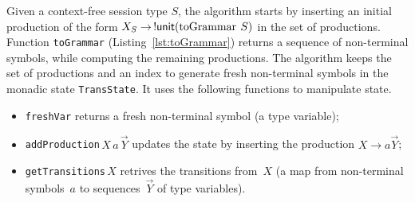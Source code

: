 
Given a context-free session type $S$, the algorithm starts by
inserting an initial production of the form
$X_S \rightarrow \,\initialProd(\toGrammarf\,S)$ in the set of
productions.
%
Function \lstinline|toGrammar| (Listing~\ref{lst:toGrammar}) returns a
sequence of non-terminal symbols, while computing the remaining
productions.
%
%
The algorithm keeps the set of productions and an index to generate
fresh non-terminal symbols in the monadic state
\lstinline{TransState}. It uses the following functions to manipulate
state.
%
\begin{itemize}
\item \lstinline{freshVar} returns a fresh non-terminal symbol (a type
  variable);
\item \lstinline{addProduction}$\,X\,a\,\vec Y$ updates the state by inserting
  the production $X\rightarrow a\vec Y$;
\item \lstinline|getTransitions|$\,X$ retrives the transitions
  from~$X$ (a map from non-terminal symbols~$a$ to sequences~$\vec Y$
  of type variables).
\end{itemize}


